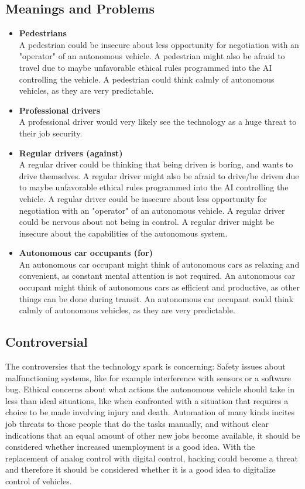 \subsection*{Meanings and Problems}
\begin{itemize}
    \item \textbf{Pedestrians}\\
    A pedestrian could be insecure about less opportunity for negotiation with an "operator" of an autonomous vehicle.
    A pedestrian might also be afraid to travel due to maybe unfavorable ethical rules programmed into the AI controlling the vehicle.
    A pedestrian could think calmly of autonomous vehicles, as they are very predictable.

    \item \textbf{Professional drivers}\\
    A professional driver would very likely see the technology as a huge threat to their job security.

    \item \textbf{Regular drivers (against)}\\
    A regular driver could be thinking that being driven is boring, and wants to drive themselves.
    A regular driver might also be afraid to drive/be driven due to maybe unfavorable ethical rules programmed into the AI controlling the vehicle.
    A regular driver could be insecure about less opportunity for negotiation with an "operator" of an autonomous vehicle.
    A regular driver could be nervous about not being in control.
    A regular driver might be insecure about the capabilities of the autonomous system.

    \item \textbf{Autonomous car occupants (for)}\\
    An autonomous car occupant might think of autonomous cars as relaxing and convenient, as constant mental attention is not required.
    An autonomous car occupant might think of autonomous cars as efficient and productive, as other things can be done during transit.
    An autonomous car occupant could think calmly of autonomous vehicles, as they are very predictable.

\end{itemize}

\subsection*{Controversial}
The controversies that the technology spark is concerning: Safety issues about malfunctioning systems, like for example interference with sensors or a software bug.
Ethical concerns about what actions the autonomous vehicle should take in less than ideal situations, like when confronted with a situation that requires a choice to be made involving injury and death. 
Automation of many kinds incites job threats to those people that do the tasks manually, and without clear indications that an equal amount of other new jobs become available, it should be considered whether increased unemployment is a good idea.
With the replacement of analog control with digital control, hacking could become a threat and therefore it should be considered whether it is a good idea to digitalize control of vehicles.

